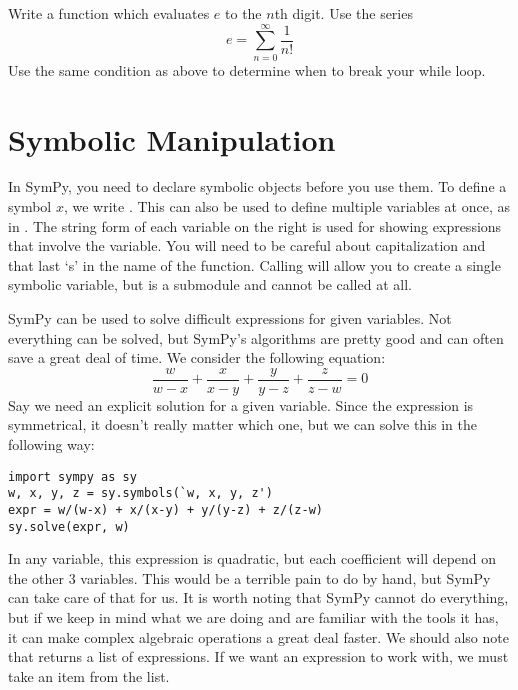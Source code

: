 \begin{problem}
Write a function which evaluates $e$ to the $n$th digit.
Use the series 
\begin{equation*}
e=\sum_{n=0}^{\infty} \frac{1}{n!}
\end{equation*}
Use the same condition as above to determine when to break your while loop.
\end{problem}

\section*{Symbolic Manipulation}
In SymPy, you need to declare symbolic objects before you use them.
To define a symbol $x$, we write .
This can also be used to define multiple variables at once, as in .
The string form of each variable on the right is used for showing expressions that involve the variable.
You will need to be careful about capitalization and that last `s' in the name of the function.
Calling  will allow you to create a single symbolic variable, but  is a submodule and cannot be called at all.

SymPy can be used to solve difficult expressions for given variables.
Not everything can be solved, but SymPy's algorithms are pretty good and can often save a great deal of time.
We consider the following equation:
\begin{equation*}
\frac{w}{w-x}+\frac{x}{x-y}+\frac{y}{y-z}+\frac{z}{z-w}=0
\end{equation*}
Say we need an explicit solution for a given variable. 
Since the expression is symmetrical, it doesn't really matter which one, but we can solve this in the following way:
\begin{lstlisting}
import sympy as sy
w, x, y, z = sy.symbols(`w, x, y, z')
expr = w/(w-x) + x/(x-y) + y/(y-z) + z/(z-w)
sy.solve(expr, w)
\end{lstlisting}
In any variable, this expression is quadratic, but each coefficient will depend on the other 3 variables.
This would be a terrible pain to do by hand, but SymPy can take care of that for us.
It is worth noting that SymPy cannot do everything, but if we keep in mind what we are doing and are familiar with the tools it has, it can make complex algebraic operations a great deal faster. 
We should also note that  returns a list of expressions.
If we want an expression to work with, we must take an item from the list.

